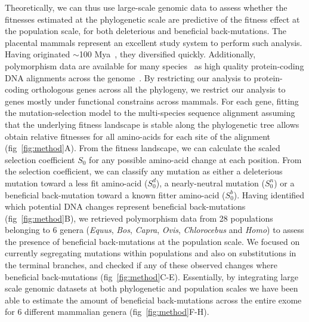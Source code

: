 \documentclass{article}
\newcommand{\Sphy}{S_{0}}
\newcommand{\SphyDel}{\Sphy^{d}}
\newcommand{\SphyNeu}{\Sphy^{n}}
\newcommand{\SphyBen}{\Sphy^{b}}
\begin{document}
    Theoretically, we can thus use large-scale genomic data to assess whether the fitnesses estimated at the phylogenetic scale are predictive of the fitness effect at the population scale, for both deleterious and beneficial back-mutations.
    The placental mammals represent an excellent study system to perform such analysis.
    Having originated $\sim$100 Mya~\cite{kumar_timetree_2017}, they diversified quickly.
    Additionally, polymorphism data are available for many species~\cite{howe_ensembl_2021} as high quality protein-coding DNA alignments across the genome~\cite{ranwez_orthomam_2007, scornavacca_orthomam_2019}.
    By restricting our analysis to protein-coding orthologous genes across all the phylogeny, we restrict our analysis to genes mostly under functional constrains across mammals.
    For each gene, fitting the mutation-selection model to the multi-species sequence alignment assuming that the underlying fitness landscape is stable along the phylogenetic tree allows obtain relative fitnesses for all amino-acids for each site of the alignment (fig~\ref{fig:method}A).
    From the fitness landscape, we can calculate the scaled selection coefficient $\Sphy$ for any possible amino-acid change at each position.
    From the selection coefficient, we can classify any mutation as either a deleterious mutation toward a less fit amino-acid ($\SphyDel$), a nearly-neutral mutation ($\SphyNeu$) or a beneficial back-mutation toward a known fitter amino-acid ($\SphyBen$).
    Having identified which potential DNA changes represent beneficial back-mutations (fig~\ref{fig:method}B), we retrieved polymorphism data from 28 populations belonging to 6 genera (\textit{Equus}, \textit{Bos}, \textit{Capra}, \textit{Ovis}, \textit{Chlorocebus} and \textit{Homo}) to assess the presence of beneficial back-mutations at the population scale.
    We focused on currently segregating mutations within populations and also on substitutions in the terminal branches, and checked if any of these observed changes where beneficial back-mutations (fig~\ref{fig:method}C-E).
    Essentially, by integrating large scale genomic datasets at both phylogenetic and population scales we have been able to estimate the amount of beneficial back-mutations across the entire exome for 6 different mammalian genera (fig~\ref{fig:method}F-H).
\end{document}
